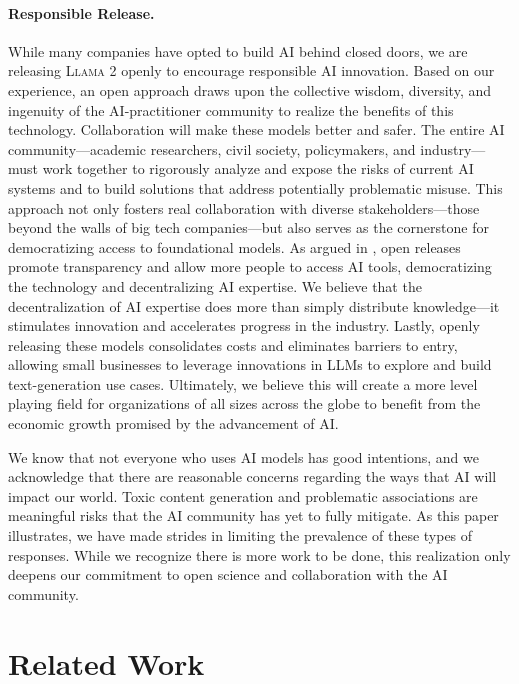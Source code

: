 \documentclass{article}
\newcommand{\cinnamon}{\textsc{Llama 2}\xspace}
\begin{document}
\paragraph{Responsible Release.} While many companies have opted to build AI behind closed doors, we are releasing \cinnamon openly to encourage responsible AI innovation. Based on our experience, an open approach draws upon the collective wisdom, diversity, and ingenuity of the AI-practitioner community to realize the benefits of this technology. Collaboration will make these models better and safer. The entire AI community—academic researchers, civil society, policymakers, and industry—must work together to rigorously analyze and expose the risks of current AI systems and to build solutions that address potentially problematic misuse. This approach not only fosters real collaboration with diverse stakeholders—those beyond the walls of big tech companies—but also serves as the cornerstone for democratizing access to foundational models. As argued in \cite{zellers2019defending}, open releases promote transparency and allow more people to access AI tools, democratizing the technology and decentralizing AI expertise. We believe that the decentralization of AI expertise does more than simply distribute knowledge—it stimulates innovation and accelerates progress in the industry. Lastly, openly releasing these models consolidates costs and eliminates barriers to entry, allowing small businesses to leverage innovations in LLMs to explore and build text-generation use cases. Ultimately, we believe this will create a more level playing field for organizations of all sizes across the globe to benefit from the economic growth promised by the advancement of AI. 

We know that not everyone who uses AI models has good intentions, and we acknowledge that there are reasonable concerns regarding the ways that AI will impact our world. Toxic content generation and problematic associations are meaningful risks that the AI community has yet to fully mitigate. As this paper illustrates, we have made strides in limiting the prevalence of these types of responses. While we recognize there is more work to be done, this realization only deepens our commitment to open science and collaboration with the AI community.


\section{Related Work}
\label{sec:related_works}
\end{document}
